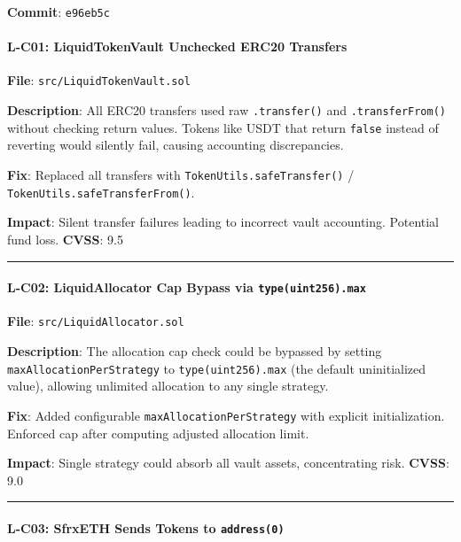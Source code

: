 \documentclass[
]{article}
\begin{document}
\textbf{Commit}: \texttt{e96eb5c}

\paragraph{L-C01: LiquidTokenVault Unchecked ERC20
Transfers}\label{l-c01-liquidtokenvault-unchecked-erc20-transfers}

\textbf{File}: \texttt{src/LiquidTokenVault.sol}

\textbf{Description}: All ERC20 transfers used raw \texttt{.transfer()}
and \texttt{.transferFrom()} without checking return values. Tokens like
USDT that return \texttt{false} instead of reverting would silently
fail, causing accounting discrepancies.

\textbf{Fix}: Replaced all transfers with
\texttt{TokenUtils.safeTransfer()} /
\texttt{TokenUtils.safeTransferFrom()}.

\textbf{Impact}: Silent transfer failures leading to incorrect vault
accounting. Potential fund loss. \textbf{CVSS}: 9.5

\begin{center}\rule{0.5\linewidth}{0.5pt}\end{center}

\paragraph{\texorpdfstring{L-C02: LiquidAllocator Cap Bypass via
\texttt{type(uint256).max}}{L-C02: LiquidAllocator Cap Bypass via type(uint256).max}}\label{l-c02-liquidallocator-cap-bypass-via-typeuint256max}

\textbf{File}: \texttt{src/LiquidAllocator.sol}

\textbf{Description}: The allocation cap check could be bypassed by
setting \texttt{maxAllocationPerStrategy} to \texttt{type(uint256).max}
(the default uninitialized value), allowing unlimited allocation to any
single strategy.

\textbf{Fix}: Added configurable \texttt{maxAllocationPerStrategy} with
explicit initialization. Enforced cap after computing adjusted
allocation limit.

\textbf{Impact}: Single strategy could absorb all vault assets,
concentrating risk. \textbf{CVSS}: 9.0

\begin{center}\rule{0.5\linewidth}{0.5pt}\end{center}

\paragraph{\texorpdfstring{L-C03: SfrxETH Sends Tokens to
\texttt{address(0)}}{L-C03: SfrxETH Sends Tokens to address(0)}}\label{l-c03-sfrxeth-sends-tokens-to-address0}
\end{document}
